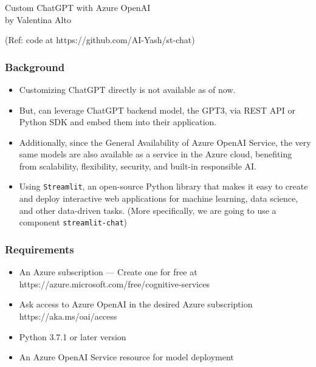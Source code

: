 \begin{frame}[fragile]\frametitle{}
\begin{center}
{\Large Custom ChatGPT with Azure OpenAI \\ by Valentina Alto}

{\tiny (Ref: code at https://github.com/AI-Yash/st-chat)}

\end{center}
\end{frame}

\begin{frame}[fragile]\frametitle{ Background}


\begin{itemize}
\item Customizing ChatGPT directly is not available as of now.
\item But, can leverage ChatGPT backend model, the GPT3, via REST API or Python SDK and embed them into their application.
\item Additionally, since the General Availability of Azure OpenAI Service, the very same models are also available as a service in the Azure cloud, benefiting from scalability, flexibility, security, and built-in responsible AI.
\item Using  \lstinline|Streamlit|, an open-source Python library that makes it easy to create and deploy interactive web applications for machine learning, data science, and other data-driven tasks. (More specifically, we are going to use a component \lstinline|streamlit-chat|)
\end{itemize}	 

\end{frame}

\begin{frame}[fragile]\frametitle{ Requirements}

\begin{itemize}
\item An Azure subscription — Create one for free at https://azure.microsoft.com/free/cognitive-services
\item Ask access to Azure OpenAI in the desired Azure subscription https://aka.ms/oai/access
\item Python 3.7.1 or later version
\item An Azure OpenAI Service resource for model deployment
\end{itemize}	 

\end{frame}

